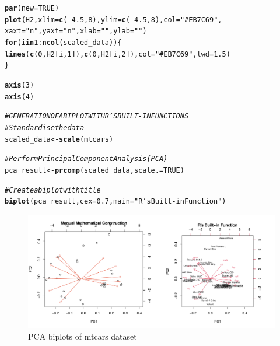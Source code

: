 \documentclass{article}\usepackage[]{graphicx}\usepackage[]{xcolor}
\makeatletter
\def\maxwidth{ %
  \ifdim\Gin@nat@width>\linewidth
    \linewidth
  \else
    \Gin@nat@width
  \fi
}
\newcommand{\hlnum}[1]{\textcolor[rgb]{0.686,0.059,0.569}{#1}}%
\newcommand{\hlstr}[1]{\textcolor[rgb]{0.192,0.494,0.8}{#1}}%
\newcommand{\hlcom}[1]{\textcolor[rgb]{0.678,0.584,0.686}{\textit{#1}}}%
\newcommand{\hlopt}[1]{\textcolor[rgb]{0,0,0}{#1}}%
\newcommand{\hlstd}[1]{\textcolor[rgb]{0.345,0.345,0.345}{#1}}%
\newcommand{\hlkwa}[1]{\textcolor[rgb]{0.161,0.373,0.58}{\textbf{#1}}}%
\newcommand{\hlkwb}[1]{\textcolor[rgb]{0.69,0.353,0.396}{#1}}%
\newcommand{\hlkwc}[1]{\textcolor[rgb]{0.333,0.667,0.333}{#1}}%
\newcommand{\hlkwd}[1]{\textcolor[rgb]{0.737,0.353,0.396}{\textbf{#1}}}%
\newenvironment{kframe}{%
 \def\at@end@of@kframe{}%
 \ifinner\ifhmode%
  \def\at@end@of@kframe{\end{minipage}}%
  \begin{minipage}{\columnwidth}%
 \fi\fi%
 \def\FrameCommand##1{\hskip\@totalleftmargin \hskip-\fboxsep
 \colorbox{shadecolor}{##1}\hskip-\fboxsep
     \hskip-\linewidth \hskip-\@totalleftmargin \hskip\columnwidth}%
 \MakeFramed {\advance\hsize-\width
   \@totalleftmargin\z@ \linewidth\hsize
   \@setminipage}}%
 {\par\unskip\endMakeFramed%
 \at@end@of@kframe}
\newenvironment{knitrout}{}{} %
\numberwithin{equation}{section}
\makeatother
\begin{document}
\begin{knitrout}
\begin{kframe}
\begin{alltt}
\hlkwd{par}\hlstd{(}\hlkwc{new} \hlstd{=} \hlnum{TRUE}\hlstd{)}
\hlkwd{plot}\hlstd{(H2,} \hlkwc{xlim} \hlstd{=} \hlkwd{c}\hlstd{(}\hlopt{-}\hlnum{4.5}\hlstd{,} \hlnum{8}\hlstd{),} \hlkwc{ylim} \hlstd{=} \hlkwd{c}\hlstd{(}\hlopt{-}\hlnum{4.5}\hlstd{,} \hlnum{8}\hlstd{),} \hlkwc{col} \hlstd{=} \hlstr{"#EB7C69"}\hlstd{,}
     \hlkwc{xaxt} \hlstd{=} \hlstr{"n"}\hlstd{,} \hlkwc{yaxt} \hlstd{=} \hlstr{"n"}\hlstd{,} \hlkwc{xlab} \hlstd{=} \hlstr{""}\hlstd{,} \hlkwc{ylab} \hlstd{=} \hlstr{""}\hlstd{)}
\hlkwa{for} \hlstd{(i} \hlkwa{in} \hlnum{1}\hlopt{:}\hlkwd{ncol}\hlstd{(scaled_data)) \{}
  \hlkwd{lines}\hlstd{(}\hlkwd{c}\hlstd{(}\hlnum{0}\hlstd{, H2[i,} \hlnum{1}\hlstd{]),} \hlkwd{c}\hlstd{(}\hlnum{0}\hlstd{, H2[i,} \hlnum{2}\hlstd{]),} \hlkwc{col} \hlstd{=} \hlstr{"#EB7C69"}\hlstd{,} \hlkwc{lwd} \hlstd{=} \hlnum{1.5}\hlstd{)}
\hlstd{\}}

\hlkwd{axis}\hlstd{(}\hlnum{3}\hlstd{)}
\hlkwd{axis}\hlstd{(}\hlnum{4}\hlstd{)}

\hlcom{#GENERATION OF A BIPLOT WITH R'S BUILT-IN FUNCTIONS}
\hlcom{# Standardise the data}
\hlstd{scaled_data} \hlkwb{<-} \hlkwd{scale}\hlstd{(mtcars)}

\hlcom{# Perform Principal Component Analysis (PCA)}
\hlstd{pca_result} \hlkwb{<-} \hlkwd{prcomp}\hlstd{(scaled_data,} \hlkwc{scale.} \hlstd{=} \hlnum{TRUE}\hlstd{)}

\hlcom{# Create a biplot with title}
\hlkwd{biplot}\hlstd{(pca_result,} \hlkwc{cex} \hlstd{=} \hlnum{0.7}\hlstd{,} \hlkwc{main} \hlstd{=} \hlstr{"R's Built-in Function"}\hlstd{)}
\end{alltt}
\end{kframe}\begin{figure}[H]

{\centering \includegraphics[width=\maxwidth]{figure/beamer-PCAbiplot-1} 

}

\caption[PCA biplots of mtcars dataset]{PCA biplots of mtcars dataset}\label{fig:PCAbiplot}
\end{figure}

\end{knitrout}
\end{document}
